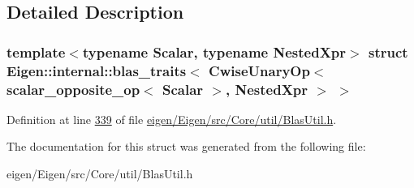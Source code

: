 \subsection{Detailed Description}
\subsubsection*{template$<$typename Scalar, typename Nested\+Xpr$>$\newline
struct Eigen\+::internal\+::blas\+\_\+traits$<$ Cwise\+Unary\+Op$<$ scalar\+\_\+opposite\+\_\+op$<$ Scalar $>$, Nested\+Xpr $>$ $>$}



Definition at line \hyperlink{eigen_2_eigen_2src_2_core_2util_2_blas_util_8h_source_l00339}{339} of file \hyperlink{eigen_2_eigen_2src_2_core_2util_2_blas_util_8h_source}{eigen/\+Eigen/src/\+Core/util/\+Blas\+Util.\+h}.



The documentation for this struct was generated from the following file\+:\begin{DoxyCompactItemize}
\item 
eigen/\+Eigen/src/\+Core/util/\+Blas\+Util.\+h\end{DoxyCompactItemize}

